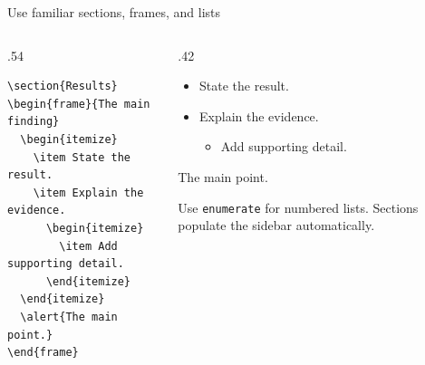 \begin{frame}[fragile=singleslide]{Use familiar sections, frames, and lists}
  \begin{columns}[T,onlytextwidth]
    \begin{column}{.54\textwidth}
      \small
\begin{verbatim}
\section{Results}
\begin{frame}{The main finding}
  \begin{itemize}
    \item State the result.
    \item Explain the evidence.
      \begin{itemize}
        \item Add supporting detail.
      \end{itemize}
  \end{itemize}
  \alert{The main point.}
\end{frame}
\end{verbatim}
    \end{column}
    \begin{column}{.42\textwidth}
      \begin{itemize}
        \item State the result.
        \item Explain the evidence.
          \begin{itemize}
            \item Add supporting detail.
          \end{itemize}
      \end{itemize}
      \medskip
      \alert{The main point.}
      \bigskip

      Use \texttt{enumerate} for numbered lists. Sections populate the
      sidebar automatically.
    \end{column}
  \end{columns}
\end{frame}

